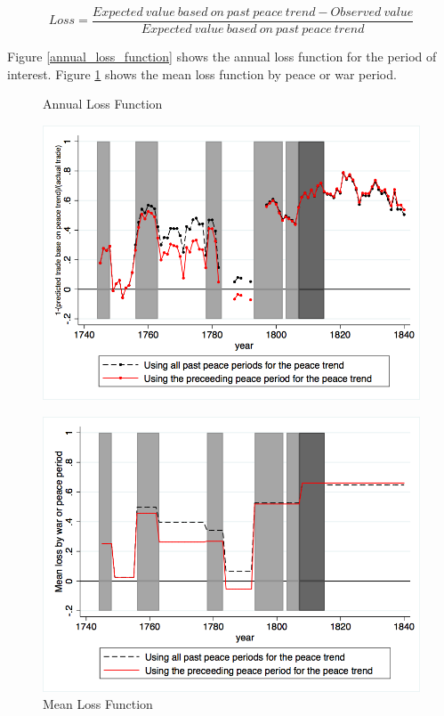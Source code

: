 \documentclass[12pt,a4paper,notitlepage]{article}
\begin{document}
\begin{equation*}
Loss = \frac{Expected \> value \> based \> on \>past \> peace \>trend - Observed \> value}{Expected \> value \> based \> on \>past \> peace \>trend}
\end{equation*}

 Figure \ref{annual_loss_function} shows the annual loss function for the period of interest. Figure \ref{mean_loss_function} shows the mean loss function by peace or war period.

\begin{figure}[H]
	\begin{minipage}[b]{0.45\linewidth}
		\caption{Annual Loss Function}
		\centering
		\label{annual_loss_function}
		\includegraphics[scale=.3]		{Annual_loss_function.png}
	\end{minipage}
	 \hspace{0.5cm}
     \begin{minipage}[b]{0.45\linewidth}
	\caption{Mean Loss Function}
	\label{mean_loss_function}
	\includegraphics[scale=.3]{Mean_loss_function.png}
	\end{minipage}
\end{figure}
\end{document}
